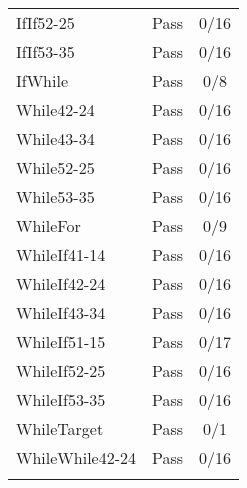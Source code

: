\begin{table}[htbp!]
\begin{tabular}{lcc}
         IfIf52-25 & Pass & 0/16 \\
         IfIf53-35 & Pass & 0/16 \\
         IfWhile & Pass & 0/8 \\
         While42-24 & Pass & 0/16 \\
         While43-34 & Pass & 0/16 \\
         While52-25 & Pass & 0/16 \\
         While53-35 & Pass & 0/16 \\
         WhileFor & Pass & 0/9 \\
         WhileIf41-14 & Pass & 0/16 \\
         WhileIf42-24 & Pass & 0/16 \\
         WhileIf43-34 & Pass & 0/16 \\
         WhileIf51-15 & Pass & 0/17 \\
         WhileIf52-25 & Pass & 0/16 \\
         WhileIf53-35 & Pass & 0/16 \\
         WhileTarget & Pass & 0/1 \\
         WhileWhile42-24 & Pass & 0/16 \\
      \hline\hline
      \label{Table: LoopResults} 
\end{tabular}
\end{table}
